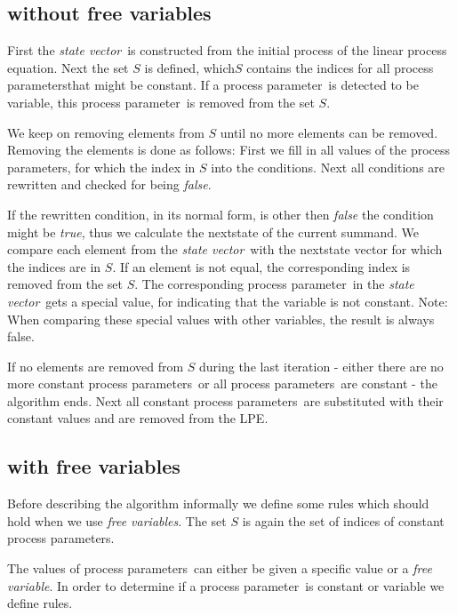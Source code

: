 \index{}\documentclass[a4paper,10pt]{article}
\theoremstyle{plain}
\theoremstyle{definition}
\newcommand{\lpe}{linear process equation}
\newcommand{\pp}{process parameter}
\newcommand{\pps}{process parameters}
\newcommand{\ti}{\textit}
\newcommand{\sv}{\textit{state vector}}
\begin{document}
\subsection{without free variables}\label{alg:org}

First the \sv\ is constructed from the initial process of the \lpe. Next the set $S$ is defined, which$S$ contains the indices for all \pps that might be constant. If a \pp\ is detected to be variable, this \pp\ is removed from the set $S$.

We keep on removing elements from $S$ until no more elements can be removed. Removing the elements is done as follows:
First we fill in all values of the \pps , for which the index in $S$ into the conditions. Next all conditions are rewritten and checked for being \ti{false}.

If the rewritten condition, in its normal form, is other then \ti{false} the condition might be \ti{true}, thus we calculate the nextstate of the current summand.  We compare each element from the \sv\ with the nextstate vector for which the indices are in $S$. If an element is not equal, the corresponding index is removed from the set $S$. The corresponding \pp\ in the \sv\ gets a special value, for indicating that the variable is not constant. Note: When comparing these special values with other variables, the result is always false. 

If no elements are removed from $S$ during the last iteration - either there are no more constant \pps\ or all \pps\ are constant - the algorithm ends. Next all constant \pps\ are substituted with their constant values and are removed from the LPE. 

\subsection{with free variables}
Before describing the algorithm informally we define some rules which should hold when we use \ti{free variables}. The set  $S$ is again the set of indices of constant \pps .

The values of \pps\ can either be given a specific value or a \ti{free variable}. In order to determine if a \pp\ is constant or variable we define rules.
\end{document}

